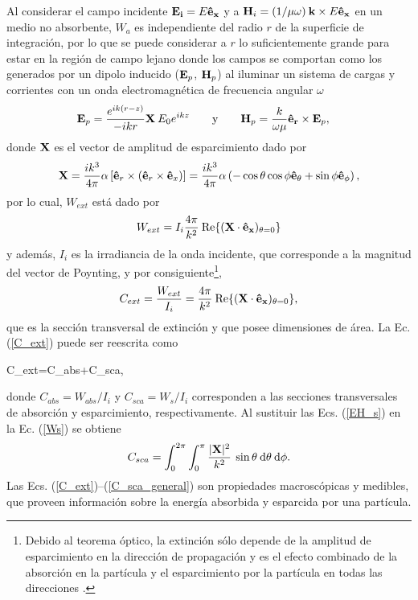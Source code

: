 Al considerar el campo incidente $\vb{E_i}=E\vb{\hat{e}_x}$ y a $\vb{H}_i=(1/\mu \omega)\: \vb{k} \times E \vb{\hat{e}_x}$ en un medio no absorbente, $W_a$ es independiente del radio $r$ de la superficie de integración, por lo que se puede considerar a $r$ lo suficientemente grande para estar en la región de campo lejano donde los campos se comportan como los generados por un dipolo inducido ($\vb{E}_p$, $\vb{H}_p$) al iluminar un sistema de cargas y corrientes con un onda electromagnética de frecuencia angular $\omega$ \cite{bohrenAbsorptionScatteringLight2008}
%
\begin{align}
	\vb{E}_{p}&=\frac{e^{ik(r-z)}}{-ikr}\vb{X}\:E_0 e^{ikz}\qquad\text{y}\qquad
	\vb{H}_{p}=\frac{k}{\omega\mu}\vb{\hat{e}_r}\times\vb{E}_{p},
	\label{EH_s}
\end{align}
%
donde $\vb{X}$ es el vector de amplitud de esparcimiento dado por
\begin{equation}
	\vb{X}=\frac{ik^3}{4\pi}\alpha \left[ \vb{\hat{e}}_r\times(\vb{\hat{e}}_r\times \vb{\hat{e}}_x)\right]=\frac{ik^3}{4\pi}\alpha \left(-\cos\theta\cos\phi \vb{\hat{e}}_{\theta}+\sin\phi \vb{\hat{e}}_{\phi} \right),
	\label{eq:Xvec}
\end{equation}
%
por lo cual, $W_{ext}$ está dado por \cite{bohrenAbsorptionScatteringLight2008}
%
\begin{equation*}
	W_{ext}=I_i\frac{4\pi}{k^2}\:\text{Re}\{(\vb{X}\cdot\vb{\hat{e}_x})_{\theta=0}\}
\end{equation*}
%
y además, $I_i$ es la irradiancia de la onda incidente, que corresponde a la magnitud del vector de Poynting, y por consiguiente\footnote{Debido al teorema óptico, la extinción sólo depende de la amplitud de esparcimiento en la dirección de propagación y es el efecto combinado de la absorción en la partícula y el esparcimiento por la partícula en todas las direcciones \cite{bohrenAbsorptionScatteringLight2008}.},
%
\begin{equation}
	C_{ext}=\frac{W_{ext}}{I_i}=\frac{4\pi}{k^2}\:\text{Re}\{(\vb{X}\cdot\vb{\hat{e}_x})_{\theta=0}\}, \label{C_ext}
\end{equation}
%
que es la sección transversal de extinción y que posee dimensiones de área. La Ec. (\ref{C_ext}) puede ser reescrita como \cite{bohrenAbsorptionScatteringLight2008}
%
\begin{tcolorbox}
	C_{ext}=C_{abs}+C_{sca},
	\label{C}
\end{tcolorbox}
%
donde $C_{abs}=W_{abs}/I_i$ y $C_{sca}=W_s/I_i$ corresponden a las secciones transversales de absorción y esparcimiento, respectivamente. Al sustituir las Ecs. (\ref{EH_s}) en la Ec. (\ref{Ws}) se obtiene
%
\begin{equation}
	C_{sca}=\int_0^{2\pi}\int_0^{\pi}\frac{|\vb{X}|^2}{k^2}\:\sin\theta\: \text{d}\theta\:\text{d}\phi.
	\label{C_sca_general}
\end{equation}
Las Ecs. (\ref{C_ext})--(\ref{C_sca_general}) son propiedades macroscópicas y medibles, que proveen información sobre la energía absorbida y esparcida por una partícula.  \\

